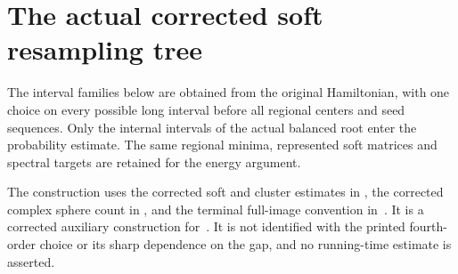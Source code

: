 \section{The actual corrected soft resampling tree}
\label{sec:physical_soft_resampling_tree}

The interval families below are obtained from the original Hamiltonian,
with one choice on every possible long interval before all regional centers
and seed sequences. Only the internal intervals of the actual balanced root
enter the probability estimate. The same regional minima, represented soft
matrices and spectral targets are retained for the energy argument.

The construction uses the corrected soft and cluster estimates in
\cite{gap:alvv16_soft_regional_residuals,gap:alvv16_cluster_approximation},
the corrected complex sphere count in
\cite{gap:alvv16_random_sampling_net_count}, and the terminal full-image
convention in~\cite{gap:alvv16_bootstrap_constants}. It is a corrected
auxiliary construction for~\cite[lines 749--755 and 1777--1817]{Arad2016RigorousRG}.
It is not identified with the printed fourth-order choice or its sharp
dependence on the gap, and no running-time estimate is asserted.

